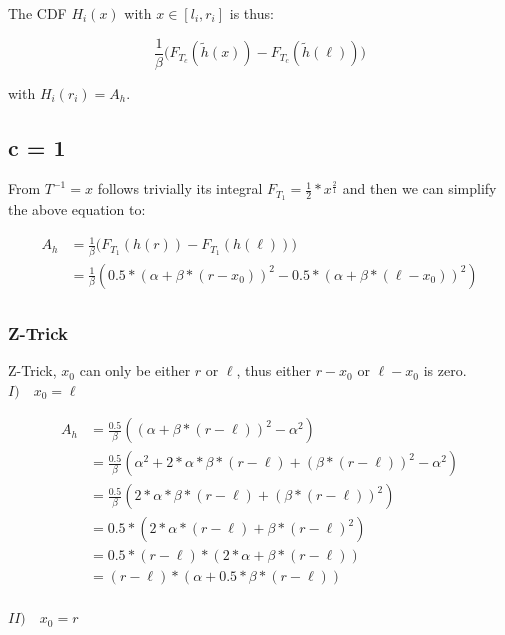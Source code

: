 \documentclass[]{article}
\begin{document}
The CDF $H_i(x)$ with $x \in [l_i, r_i]$ is thus:

\[ \frac{1}{\beta} \big( F_{T_c} (\tilde{h}(x)) - F_{T_c}(\tilde{h}(\ell)) \big) \]

with $H_i(r_i) = A_h$.

\subsection{c = 1}

From  $T^{-1} = x$ follows trivially its integral $F_{T_1} = \frac{1}{2} * x^{\frac{2}{1}}$
and then we can simplify the above equation to:

\begin{align*}
A_h &= \frac{1}{\beta} \big(F_{T_1}(h(r)) - F_{T_1}(h(\ell)) \big) \\
&= \frac{1}{\beta} \left(0.5 * (\alpha + \beta * (r - x_0))^2 - 0.5 * (\alpha + \beta * (\ell - x_0))^2 \right) \\
\end{align*}

\subsubsection{Z-Trick}

Z-Trick, $x_0$ can only be either $r$ or $\ell$, thus either $r - x_0$ or $\ell - x_0$ is zero. \\

\textbf{$I) \quad x_0 = \ell$}

\begin{align*}
A_h &= \frac{0.5}{\beta} \left( (\alpha + \beta * (r - \ell))^2 - \alpha^2  \right) \\
&= \frac{0.5}{\beta} \left( \alpha^2 + 2 * \alpha * \beta * (r - \ell) + (\beta * (r - \ell))^2 - \alpha^2  \right) \\
&= \frac{0.5}{\beta} \left( 2 * \alpha * \beta * (r - \ell) + (\beta * (r - \ell))^2 \right) \\
&= 0.5 * \left( 2 * \alpha * (r - \ell) + \beta * (r - \ell)^2 \right) \\
&= 0.5 * (r - \ell) * \left( 2 * \alpha  + \beta * (r - \ell) \right) \\
&= (r - \ell) * \left(\alpha  + 0.5 * \beta * (r - \ell) \right) \\
\end{align*}

\textbf{$II) \quad x_0 = r$}
\end{document}
